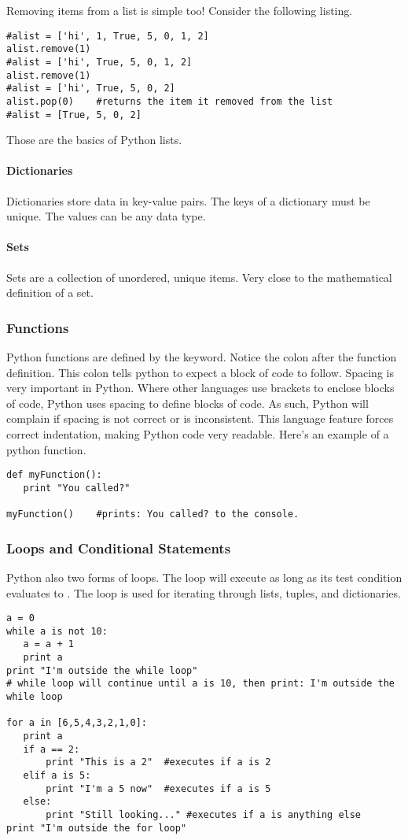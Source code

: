 Removing items from a list is simple too!  Consider the following listing.
\begin{lstlisting}[style=python]
#alist = ['hi', 1, True, 5, 0, 1, 2]
alist.remove(1)
#alist = ['hi', True, 5, 0, 1, 2]
alist.remove(1)
#alist = ['hi', True, 5, 0, 2]
alist.pop(0)    #returns the item it removed from the list
#alist = [True, 5, 0, 2]
\end{lstlisting}
Those are the basics of Python lists.

\paragraph{Dictionaries}
Dictionaries store data in key-value pairs.  The keys of a dictionary must be unique.  The values can be any data type.

\paragraph{Sets}
Sets are a collection of unordered, unique items.  Very close to the mathematical definition of a set.

\subsubsection*{Functions}
Python functions are defined by the  keyword.  Notice the colon after the function definition.  This colon tells python to expect a block of code to follow.  Spacing is very important in Python.  Where other languages use brackets to enclose blocks of code, Python uses spacing to define blocks of code.  As such, Python will complain if spacing is not correct or is inconsistent.  This language feature forces correct indentation, making Python code very readable.  Here's an example of a python function.
\begin{lstlisting}[style=python]
def myFunction():
   print "You called?"

myFunction()	#prints: You called? to the console.
\end{lstlisting}

\subsubsection*{Loops and Conditional Statements}
Python also two forms of loops.  The  loop will execute as long as its test condition evaluates to .  The  loop is used for iterating through lists, tuples, and dictionaries.
\begin{lstlisting}
a = 0
while a is not 10:
   a = a + 1
   print a
print "I'm outside the while loop"
# while loop will continue until a is 10, then print: I'm outside the while loop

for a in [6,5,4,3,2,1,0]:
   print a
   if a == 2:
       print "This is a 2"	#executes if a is 2
   elif a is 5:
       print "I'm a 5 now"	#executes if a is 5
   else:
       print "Still looking..."	#executes if a is anything else
print "I'm outside the for loop"
\end{lstlisting}


